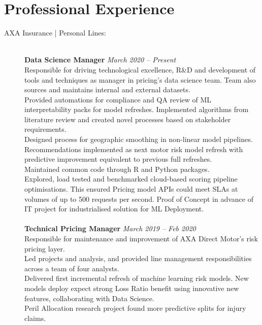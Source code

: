 \documentclass[11pt]{article}
\begin{document}
\section*{Professional Experience}
\begin{description}

\item[AXA Insurance | Personal Lines:] \hspace{1mm} \\
\textbf{Data Science Manager} \emph{March 2020 -- Present}\\
\textbullet \quad Responsible for driving technological excellence, R\&D and development of tools and techniques as manager in pricing's data science team. Team also sources and maintains internal and external datasets. \\
\textbullet \quad Provided automations for compliance and QA review of ML interpretability packs for model refreshes. Implemented algorithms from literature review and created novel processes based on stakeholder requirements. \\
\textbullet \quad Designed process for geographic smoothing in non-linear model pipelines. Recommendations implemented as next motor risk model refresh with predictive improvement equivalent to previous full refreshes.\\
\textbullet \quad Maintained common code through R and Python packages. \\
\textbullet \quad Explored, load tested and benchmarked cloud-based scoring pipeline optimisations. This ensured Pricing model APIs could meet SLAs at volumes of up to 500 requests per second. Proof of Concept in advance of IT project for industrialised solution for ML Deployment.
\\\\
\textbf{Technical Pricing Manager} \emph{March 2019 -- Feb 2020}\\
\textbullet \quad Responsible for maintenance and improvement of AXA Direct Motor's risk pricing layer.\\
\textbullet \quad Led projects and analysis, and provided line management responsibilities across a team of four analysts.\\
\textbullet \quad Delivered first incremental refresh of machine learning risk models. New models deploy expect strong Loss Ratio benefit using innovative new features, collaborating with Data Science.\\
\textbullet \quad Peril Allocation research project found more predictive splits for injury claims.\\

\end{description}
\end{document}
